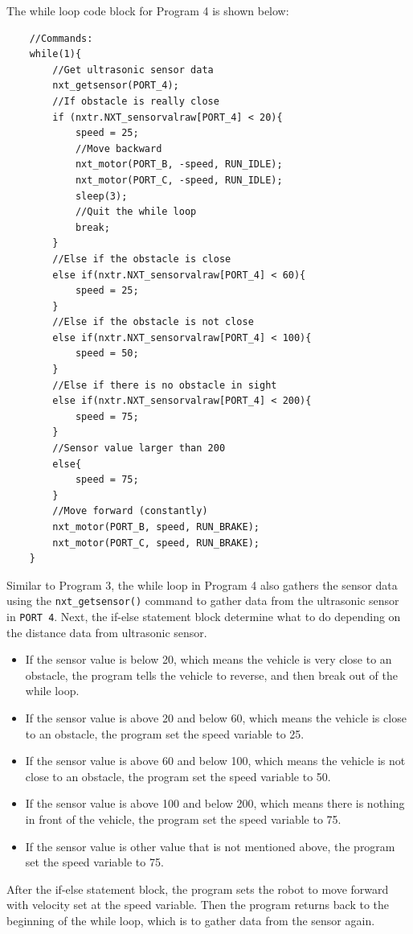 \documentclass[12pt]{article}
\begin{document}
The while loop code block for Program 4 is shown below:
\begin{verbatim}
    //Commands:
    while(1){
        //Get ultrasonic sensor data
        nxt_getsensor(PORT_4);
        //If obstacle is really close
        if (nxtr.NXT_sensorvalraw[PORT_4] < 20){
            speed = 25;
            //Move backward
            nxt_motor(PORT_B, -speed, RUN_IDLE);
            nxt_motor(PORT_C, -speed, RUN_IDLE);
            sleep(3);
            //Quit the while loop
            break;
        }
        //Else if the obstacle is close
        else if(nxtr.NXT_sensorvalraw[PORT_4] < 60){
            speed = 25;
        }
        //Else if the obstacle is not close
        else if(nxtr.NXT_sensorvalraw[PORT_4] < 100){
            speed = 50;
        }
        //Else if there is no obstacle in sight
        else if(nxtr.NXT_sensorvalraw[PORT_4] < 200){
            speed = 75;
        }
        //Sensor value larger than 200
        else{
            speed = 75;
        }
        //Move forward (constantly)
        nxt_motor(PORT_B, speed, RUN_BRAKE);
        nxt_motor(PORT_C, speed, RUN_BRAKE);
    }
\end{verbatim}
\noindent
Similar to Program 3, the while loop in Program 4 also gathers the sensor data using the
    \verb+nxt_getsensor()+ command to gather data from the ultrasonic sensor in \verb+PORT 4+.
Next, the if-else statement block determine what to do depending on the distance data from ultrasonic sensor.
\begin{itemize}
\item If the sensor value is below 20, which means the vehicle is very close to an obstacle, the program tells the
    vehicle to reverse, and then break out of the while loop.
\item If the sensor value is above 20 and below 60, which means the vehicle is close to an obstacle, the
    program set the speed variable to 25.
\item If the sensor value is above 60 and below 100, which means the vehicle is not close to an obstacle, the
    program set the speed variable to 50.
\item If the sensor value is above 100 and below 200, which means there is nothing in front of the vehicle,
    the program set the speed variable to 75.
\item If the sensor value is other value that is not mentioned above, the program set the speed variable to 75.
\end{itemize}
After the if-else statement block, the program sets the robot to move forward with velocity set at the speed variable.
Then the program returns back to the beginning of the while loop, which is to gather data from the sensor again.
\end{document}
